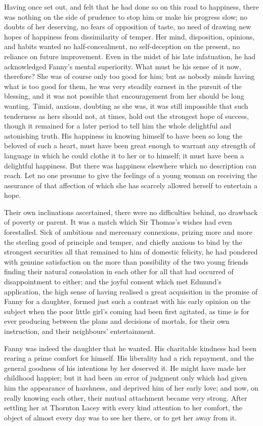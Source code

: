 Having once set out, and felt that he had done so on
this road to happiness, there was nothing on the side
of prudence to stop him or make his progress slow;
no doubts of her deserving, no fears of opposition of taste,
no need of drawing new hopes of happiness from dissimilarity
of temper.  Her mind, disposition, opinions, and habits
wanted no half-concealment, no self-deception on the present,
no reliance on future improvement.  Even in the midst
of his late infatuation, he had acknowledged Fanny's
mental superiority.  What must be his sense of it now,
therefore?  She was of course only too good for him;
but as nobody minds having what is too good for them,
he was very steadily earnest in the pursuit of the blessing,
and it was not possible that encouragement from her should
be long wanting.  Timid, anxious, doubting as she was,
it was still impossible that such tenderness as hers
should not, at times, hold out the strongest hope of success,
though it remained for a later period to tell him the whole
delightful and astonishing truth.  His happiness in knowing
himself to have been so long the beloved of such a heart,
must have been great enough to warrant any strength of
language in which he could clothe it to her or to himself;
it must have been a delightful happiness.  But there
was happiness elsewhere which no description can reach.
Let no one presume to give the feelings of a young woman
on receiving the assurance of that affection of which
she has scarcely allowed herself to entertain a hope.

Their own inclinations ascertained, there were no
difficulties behind, no drawback of poverty or parent.
It was a match which Sir Thomas's wishes had even forestalled.
Sick of ambitious and mercenary connexions, prizing more
and more the sterling good of principle and temper,
and chiefly anxious to bind by the strongest securities
all that remained to him of domestic felicity, he had
pondered with genuine satisfaction on the more than
possibility of the two young friends finding their natural
consolation in each other for all that had occurred
of disappointment to either; and the joyful consent
which met Edmund's application, the high sense of having
realised a great acquisition in the promise of Fanny
for a daughter, formed just such a contrast with his
early opinion on the subject when the poor little girl's
coming had been first agitated, as time is for ever
producing between the plans and decisions of mortals,
for their own instruction, and their neighbours' entertainment.

Fanny was indeed the daughter that he wanted.  His charitable
kindness had been rearing a prime comfort for himself.
His liberality had a rich repayment, and the general
goodness of his intentions by her deserved it.  He might
have made her childhood happier; but it had been an error
of judgment only which had given him the appearance
of harshness, and deprived him of her early love;
and now, on really knowing each other, their mutual
attachment became very strong.  After settling her at
Thornton Lacey with every kind attention to her comfort,
the object of almost every day was to see her there,
or to get her away from it.

